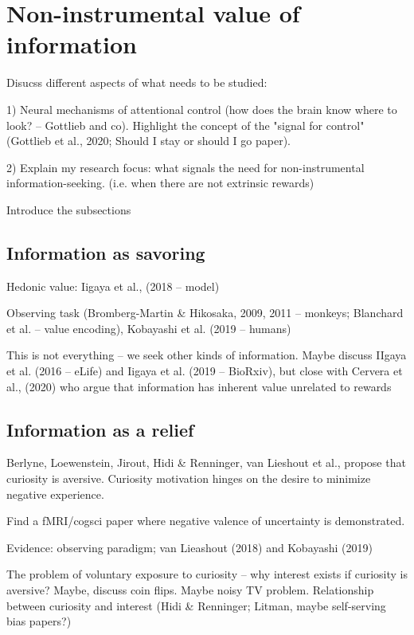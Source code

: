 \section{Non-instrumental value of information}

    Disucss different aspects of what needs to be studied: 
    
    1) Neural mechanisms of attentional control (how does the brain know where to look? -- Gottlieb and co). Highlight the concept of the "signal for control" (Gottlieb et al., 2020; Should I stay or should I go paper).

    2) Explain my research focus: what signals the need for non-instrumental information-seeking. (i.e. when there are not extrinsic rewards)\

    Introduce the subsections

    \subsection{Information as savoring}

        Hedonic value: Iigaya et al., (2018 -- model) 
            
        Observing task (Bromberg-Martin & Hikosaka, 2009, 2011 -- monkeys; Blanchard et al. -- value encoding), Kobayashi et al. (2019 -- humans)

        This is not everything -- we seek other kinds of information. Maybe discuss IIgaya et al. (2016 -- eLife) and Iigaya et al. (2019 -- BioRxiv), but close with Cervera et al., (2020) who argue that information has inherent value unrelated to rewards

    \subsection{Information as a relief}

        Berlyne, Loewenstein, Jirout, Hidi & Renninger, van Lieshout et al., propose that curiosity is aversive. Curiosity motivation hinges on the desire to minimize negative experience.

        Find a fMRI/cogsci paper where negative valence of uncertainty is demonstrated.

        Evidence: observing paradigm; van Lieashout (2018) and Kobayashi (2019)

        The problem of voluntary exposure to curiosity -- why interest exists if curiosity is aversive? Maybe, discuss coin flips. Maybe noisy TV problem. Relationship between curiosity and interest (Hidi & Renninger; Litman, maybe self-serving bias papers?)

